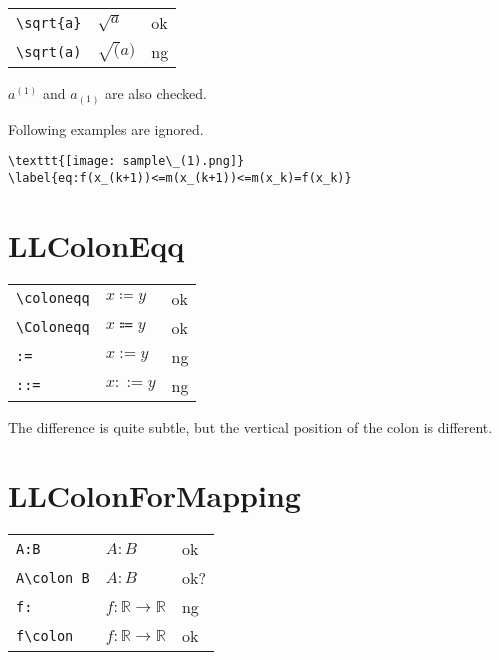 \documentclass[a4paper]{article}
\newcommand{\tA}[1]{\textcolor{cA}{#1}}
\newcommand{\tC}[1]{\textcolor{cC}{#1}}
\newcommand{\tD}[1]{\textcolor{cD}{#1}}
\begin{document}
\begin{table}[h]
	\centering
	\begin{tabular}{lll}
		\verb|\sqrt{a}| & $\sqrt{a}$ & \tA{ok} \\
		\verb|\sqrt(a)| & $\sqrt(a)$ & \tD{ng} \\
	\end{tabular}
\end{table}

$a^(1)$ and $a_(1)$ are also checked.

Following examples are ignored.
\begin{verbatim}
\texttt{[image: sample\_(1).png]}
\label{eq:f(x_(k+1))<=m(x_(k+1))<=m(x_k)=f(x_k)}
\end{verbatim}

\section{LLColonEqq}

\begin{table}[H]
	\centering
	\begin{tabular}{lll}
		\verb|\coloneqq| & $x\coloneqq y$ & \tA{ok} \\
		\verb|\Coloneqq| & $x\Coloneqq y$ & \tA{ok} \\
		\verb|:=|        & $x:= y$        & \tD{ng} \\
		\verb|::=|       & $x::= y$       & \tD{ng}
	\end{tabular}
\end{table}

The difference is quite subtle, but the vertical position of the colon is different.

\section{LLColonForMapping}

\begin{table}[H]
	\centering
	\begin{tabular}{lll}
		\verb|A:B|       & $A:B$                               & \tA{ok} \\
		\verb|A\colon B| & $A\colon B$                         & \tC{ok?} \\
		\verb|f:|        & $f:\mathbb{R} \to \mathbb{R}$       & \tD{ng} \\
		\verb|f\colon|   & $f\colon \mathbb{R} \to \mathbb{R}$ & \tA{ok}
	\end{tabular}
\end{table}
\end{document}
